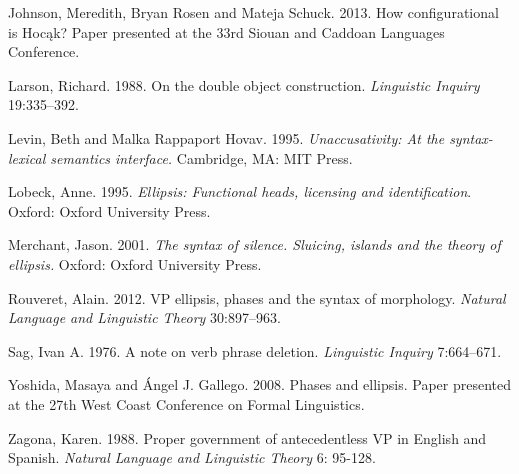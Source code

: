\documentclass[output=paper]{LSP/langsci}
\begin{document}
\begin{reflist}
Johnson, Meredith, Bryan Rosen and Mateja Schuck. 2013. How configurational is Hocąk? Paper presented at the 33rd Siouan and Caddoan Languages Conference.

Larson, Richard. 1988. On the double object construction. \emph{Linguistic Inquiry} 19:335--392.

Levin, Beth and Malka Rappaport Hovav. 1995. \emph{Unaccusativity: At the syntax-lexical semantics interface.} Cambridge, MA: MIT Press.

Lobeck, Anne. 1995. \emph{Ellipsis: Functional heads, licensing and identification}. Oxford: Oxford University Press.

Merchant, Jason. 2001. \emph{The syntax of silence. Sluicing, islands and the theory of ellipsis.} Oxford: Oxford University Press.

Rouveret, Alain. 2012. VP ellipsis, phases and the syntax of morphology. \emph{Natural Language and Linguistic Theory} 30:897--963. 

Sag, Ivan A. 1976. A note on verb phrase deletion. \emph{Linguistic Inquiry} 7:664--671.

Yoshida, Masaya and \'{A}ngel J. Gallego. 2008. Phases and ellipsis. Paper presented at the 27th West Coast Conference on Formal Linguistics.

Zagona, Karen. 1988. Proper government of antecedentless VP in English and Spanish. \emph{Natural Language and Linguistic Theory} 6: 95-128.

\end{reflist}
\end{document}
